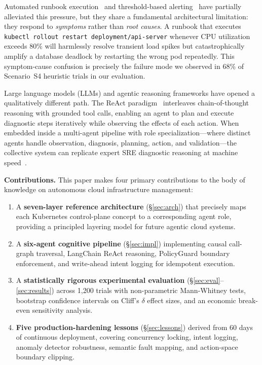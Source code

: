 \documentclass[journal,10pt,twoside]{IEEEtran}
\begin{document}
Automated runbook execution~\cite{samir2019self} and threshold-based
alerting~\cite{ibidunmoye2015performance} have partially alleviated this
pressure, but they share a fundamental architectural limitation: they
respond to \emph{symptoms} rather than \emph{root causes}. A runbook that
executes \texttt{kubectl rollout restart deployment/api-server} whenever
CPU utilization exceeds 80\% will harmlessly resolve transient load spikes
but catastrophically amplify a database deadlock by restarting the wrong
pod repeatedly. This symptom-cause confusion is precisely the failure mode
we observed in 68\% of Scenario~S4 heuristic trials in our evaluation.

Large language models (LLMs) and agentic reasoning frameworks have opened
a qualitatively different path. The ReAct paradigm~\cite{yao2022react}
interleaves chain-of-thought reasoning with grounded tool calls, enabling
an agent to plan and execute diagnostic steps iteratively while observing
the effects of each action. When embedded inside a multi-agent pipeline
with role specialization---where distinct agents handle observation,
diagnosis, planning, action, and validation---the collective system can
replicate expert SRE diagnostic reasoning at machine
speed~\cite{guo2024agents,wang2024survey}.

\textbf{Contributions.} This paper makes four primary contributions to
the body of knowledge on autonomous cloud infrastructure management:

\begin{enumerate}
\item A \textbf{seven-layer reference architecture} (\S\ref{sec:arch}) that
      precisely maps each Kubernetes control-plane concept to a corresponding
      agent role, providing a principled layering model for future
      agentic cloud systems.

\item A \textbf{six-agent cognitive pipeline} (\S\ref{sec:impl})
      implementing causal call-graph traversal, LangChain ReAct reasoning,
      PolicyGuard boundary enforcement, and write-ahead intent logging for
      idempotent execution.

\item A \textbf{statistically rigorous experimental evaluation}
      (\S\ref{sec:eval}--\ref{sec:results}) across 1{,}200 trials with
      non-parametric Mann-Whitney tests, bootstrap confidence intervals
      on Cliff's $\delta$ effect sizes, and an economic break-even
      sensitivity analysis.

\item \textbf{Five production-hardening lessons} (\S\ref{sec:lessons})
      derived from 60 days of continuous deployment, covering concurrency
      locking, intent logging, anomaly detector robustness, semantic fault
      mapping, and action-space boundary clipping.
\end{enumerate}
\end{document}
